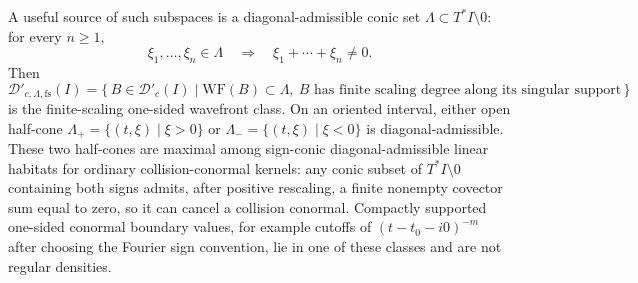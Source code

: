 \begin{defn}
  A useful source of such subspaces is a diagonal-admissible conic set
  \(\Lambda\subset T^*I\setminus0\): for every \(n\geq1\),
  \[
    \xi_1,\ldots,\xi_n\in\Lambda
    \quad\Longrightarrow\quad
    \xi_1+\cdots+\xi_n\neq0 .
  \]
  Then
  \[
    \mathcal D'_{c,\Lambda,\mathrm{fs}}(I)
      =
      \{\,B\in\mathcal D'_c(I)\mid
      \mathrm{WF}(B)\subset\Lambda,\ B
      \text{ has finite scaling degree along its singular support}\,\}
  \]
  is the finite-scaling one-sided wavefront class.  On an oriented
  interval, either open half-cone
  \(\Lambda_+=\{(t,\xi)\mid \xi>0\}\) or
  \(\Lambda_-=\{(t,\xi)\mid \xi<0\}\) is diagonal-admissible.
  These two half-cones are maximal among sign-conic diagonal-admissible
  linear habitats for ordinary collision-conormal kernels: any conic
  subset of \(T^*I\setminus0\) containing both signs admits, after
  positive rescaling, a finite nonempty covector sum equal to zero, so it
  can cancel a collision conormal.
  Compactly supported one-sided conormal boundary values, for example
  cutoffs of \((t-t_0-i0)^{-m}\) after choosing the Fourier sign
  convention, lie in one of these classes and are not regular densities.
\end{defn}

